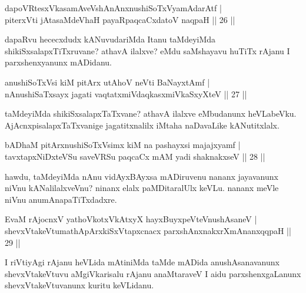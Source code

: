 
\begin{shl}
dapoVRtesxVkasamAveVshAnAnxnushiSoTxV\s yamAdarAtf | \\
piterxVti jAtasaMdeVhaH payaRpaqcaCxdatoV naqpaH \hfill|| 26 || 
\end{shl}

\begin{artha}
dapaRvu hececxdudx kANuvudariMda Itanu taMdeyiMda shikiSxsalapxTiTxruvane? athavA ilalxve? eMdu saMshayavu huTiTx rAjanu I parxshenxyanunx mADidanu.
\end{artha}

\begin{shl}
anushiSoTxV\s si kiM pitArx utAhoV neVti BaNayxtAmf | \\
nAnushiSaTxsayx jagati vaqtatxmiVdaqkasxmiVkaSxyXteV \hfill|| 27 || 
\end{shl}

\begin{artha}
taMdeyiMda shikiSxsalapxTaTxvane? athavA ilalxve eMbudanunx heVLabeVku. AjAcnxpisalapxTaTxvanige jagatitxnalilx iMtaha naDavaLike kANutitxlalx.
\end{artha}


\begin{shl}
bADhaM pitArx\s nushiSoTxV\s simx kiM na pashayxsi majajxyamf | \\
tavxtapxNiDxteVSu saveVRSu paqcaCx mAM yadi shaknakxseV \hfill|| 28 || 
\end{shl}

\begin{artha}
hawdu, taMdeyiMda nAnu vidAyxBAyxsa mADiruvenu nananx jayavanunx niVnu 
kANalilalxveVnu? ninanx elalx paMDitaralUlx keVLu. nananx meVle niVnu 
anumAnapaTiTxdadxre.
\end{artha}

\begin{shl}
EvaM rAjocnxV yathoVkotxVkAtxyX hayxBuyxpeVteV\s nushAsaneV | \\
shevxVtakeVtumathApArxkiSxVtapxcnacx parxshAnxnakxrXmAnanxqqpaH \hfill|| 29 || 
\end{shl}

\begin{artha}
I riVtiyAgi rAjanu heVLida mAtiniMda taMde mADida anushAsanavanunx 
shevxVtakeVtuvu aMgiVkarisalu rAjanu anaMtaraveV I aidu 
parxshenxgaLanunx shevxVtakeVtu\-vanunx kuritu keVLidanu.
\end{artha}


